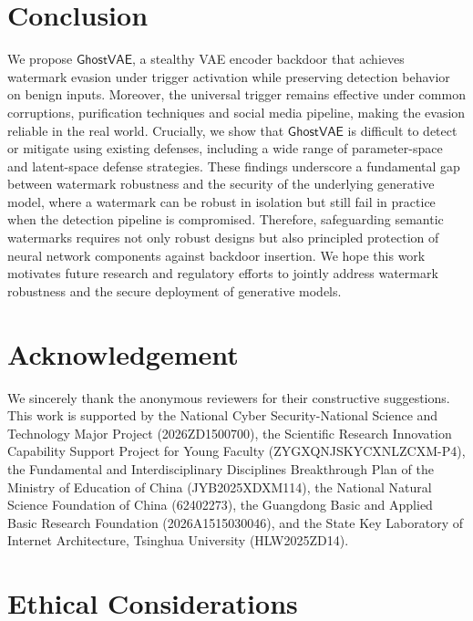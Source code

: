 \documentclass[letterpaper,twocolumn,10pt]{article}
\newcommand{\mg}{$\mathsf{GhostVAE}$\xspace}
\begin{document}

\section{Conclusion}
We propose \mg, a stealthy VAE encoder backdoor that achieves watermark evasion under trigger activation while preserving detection behavior on benign inputs.
Moreover, the universal trigger remains effective under common corruptions, purification techniques and social media pipeline, making the evasion reliable in the real world.
Crucially, we show that \mg is difficult to detect or mitigate using existing defenses, including a wide range of parameter-space and latent-space defense strategies.
These findings underscore a fundamental gap between watermark robustness and the security of the underlying generative model, where a watermark can be robust in isolation but still fail in practice when the detection pipeline is compromised.
Therefore, safeguarding semantic watermarks requires not only robust designs but also principled protection of neural network components against backdoor insertion.
We hope this work motivates future research and regulatory efforts to jointly address watermark robustness and the secure deployment of generative models.

\section*{Acknowledgement}
We sincerely thank the anonymous reviewers for their constructive suggestions. 
This work is supported by the National Cyber Security-National Science and Technology Major Project (2026ZD1500700), the Scientific Research Innovation Capability Support Project for Young Faculty (ZYGXQNJSKYCXNLZCXM-P4), the Fundamental and Interdisciplinary Disciplines Breakthrough Plan of the Ministry of Education of China (JYB2025XDXM114), the National Natural Science Foundation of China (62402273), the Guangdong Basic and Applied Basic Research Foundation (2026A1515030046), and the State Key Laboratory of Internet Architecture, Tsinghua University (HLW2025ZD14).






\appendix

\section*{Ethical Considerations}
\label{sec:ethics}
\end{document}
